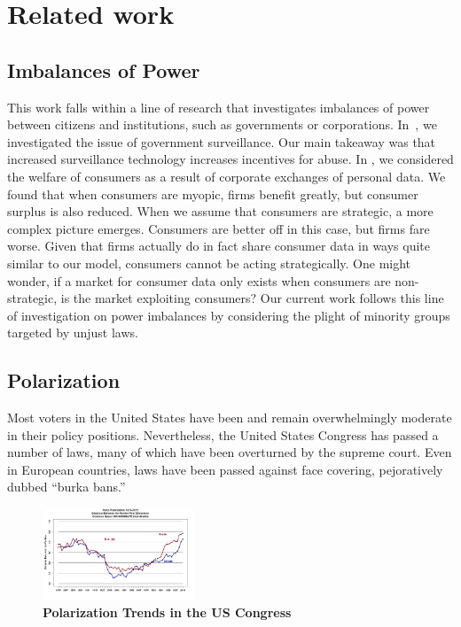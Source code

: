 
\section{Related work}
\label{sec:related}

\subsection{Imbalances of Power}
This work falls within a line of research that investigates imbalances of power between citizens and institutions, such as governments or corporations. In~\cite{laskowskigovernment}, we investigated the issue of government surveillance.  Our main takeaway was that increased surveillance technology increases incentives for abuse. In  \cite{johnsoncaviar}, we considered the welfare of consumers as a result of corporate exchanges of personal data.
We found that when consumers are myopic, firms benefit greatly, but consumer surplus is also reduced. When we assume that consumers are strategic, a more complex picture emerges. Consumers are better off in this case, but firms fare worse.  Given that firms actually do in fact share consumer data in ways quite similar to our model, consumers cannot be acting strategically.  One might wonder, if a market for consumer data only exists when consumers are non-strategic, is the market exploiting consumers?  Our current work follows this line of investigation on power imbalances by considering the plight of minority groups targeted by unjust laws.

\subsection{Polarization}
Most voters in the United States have been and remain overwhelmingly moderate in their policy positions\cite{layman2006party}. Nevertheless, the United States Congress has passed a number of laws, many of which have been overturned by the supreme court.  Even in European countries, laws have been passed %
against face covering, pejoratively dubbed ``burka bans.''

\begin{figure}[htbp]
\begin{center}
\includegraphics[width=0.4\textwidth]{figs/polar_house_and_senate_46-115_july_11}
\caption{{\bf Polarization Trends in the US Congress}}
\label{fig:uscongress}
\end{center}
\end{figure}

